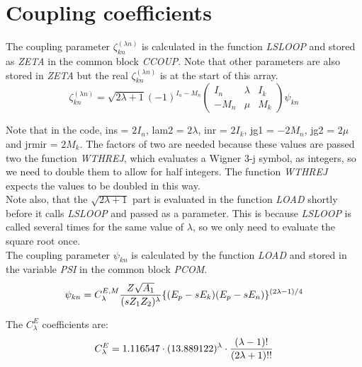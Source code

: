 \chapter{Coupling coefficients}
\label{chapt:coupling}

The coupling parameter $\zeta_{kn}^{(\lambda n)}$ is calculated in the
function {\em LSLOOP} and stored as {\em ZETA} in the common block {\em
CCOUP}. Note that other parameters are also stored in {\em ZETA} but the
real $\zeta_{kn}^{(\lambda n)}$ is at the start of this array.\\

\begin{equation}
\zeta_{kn}^{(\lambda n)} =
\sqrt{2 \lambda + 1}
(-1)^{I_n - M_n}
\begin{pmatrix}
I_n & \lambda & I_k\\
-M_n & \mu & M_k
\end{pmatrix}
\psi_{kn}
\end{equation}

Note that in the code, ins = $2I_n$, lam2 = $2\lambda$, inr = $2I_k$, jg1 =
$-2M_n$, jg2 = $2\mu$ and jrmir = $2M_k$. The factors of two are needed
because these values are passed two the function {\em WTHREJ}, which
evaluates a Wigner 3-j symbol, as integers, so we need to double them to
allow for half integers. The function {\em WTHREJ} expects the values to be
doubled in this way.\\

Note also, that the $\sqrt{2 \lambda + 1}$ part is evaluated in the function
{\em LOAD} shortly before it calls {\em LSLOOP} and passed as a parameter.
This is because {\em LSLOOP} is called several times for the same value of
$\lambda$, so we only need to evaluate the square root once.\\

The coupling parameter $\psi_{kn}$ is calculated by the function {\em LOAD}
and stored in the variable {\em PSI} in the common block {\em PCOM}.\\

\begin{equation}
\psi_{kn} = 
C_\lambda^{E,M}
{Z \sqrt{A_1} \over (s Z_1 Z_2)^\lambda}
\{(E_p - s E_k)(E_p - s E_n)\}^{(2 \lambda - 1) / 4}
\end{equation}

The $C_\lambda^{E}$ coefficients are:\\

\begin{equation}
C_\lambda^E = 1.116547 \cdot (13.889122)^\lambda \cdot
{(\lambda - 1)! \over (2 \lambda + 1)!!}
\end{equation}

